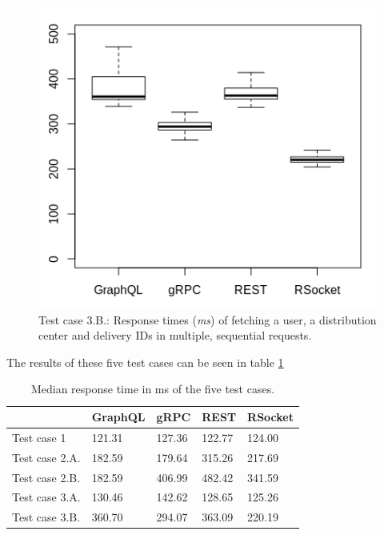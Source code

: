 \begin{figure}[ht!]
    \centerline{\includegraphics[scale=0.7]{thesis_svava/images/stagger3bnew.png}}
    \caption{Test case 3.B.: Response times (\textit{ms}) of fetching a user, a distribution center and delivery IDs in multiple, sequential requests.}
    \label{fig:stagger_3b}
\end{figure}

The results of these five test cases can be seen in table \ref{tab:results}

\begin{table}
\centering
\label{tab:results}
\begin{tabular}{l|l|l|l|l}
             & GraphQL & gRPC   & REST   & RSocket  \\ 
\hline
Test case 1  & 121.31  & 127.36 & 122.77 & 124.00   \\ 
\hline
Test case 2.A. & 182.59  & 179.64 & 315.26 & 217.69   \\ 
\hline
Test case 2.B. & 182.59  & 406.99 & 482.42 & 341.59   \\ 
\hline
Test case 3.A. & 130.46  & 142.62 & 128.65 & 125.26   \\ 
\hline
Test case 3.B. & 360.70  & 294.07 & 363.09 & 220.19  
\end{tabular}
\caption{Median response time in ms of the five test cases.}
\end{table}

